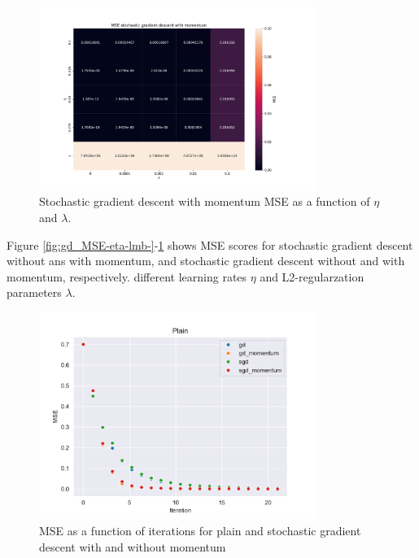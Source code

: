 \begin{figure}[H]
\centering
\includegraphics[width=0.8\textwidth]{Figures/PartA/sgdm_MSE(eta,lmb)}
\caption{Stochastic gradient descent with momentum MSE as a function of \(\eta \) and \(\lambda \).}
\label{fig:sgdm_MSE-eta-lmb-}
\end{figure}

Figure \ref{fig:gd_MSE-eta-lmb-}-\ref{fig:sgdm_MSE-eta-lmb-} shows MSE scores for 
stochastic gradient descent without ans with momentum, and stochastic gradient descent
without and with momentum, respectively. 
different learning rates \(\eta \) and L2-regularzation parameters \(\lambda \). 


\begin{figure}[H]
\centering
\includegraphics[width=0.8\textwidth]{Figures/PartA/PlainMSE(iter).pdf}
\caption{MSE as a function of iterations for plain and stochastic gradient descent with and without momentum}
\label{fig:PlainMSE-iter-pdf}
\end{figure}

